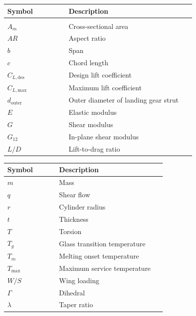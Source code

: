 \endgroup
\begingroup
\setlength{\tabcolsep}{3pt}
\renewcommand{\arraystretch}{1.08}
\scriptsize
\noindent
\begin{minipage}[t]{0.31\textwidth}
\begin{tabular}{@{}%
>{\raggedright\arraybackslash}p{0.30\linewidth}
>{\raggedright\arraybackslash}p{0.62\linewidth}@{}}
\toprule
\textbf{Symbol} & \textbf{Description} \\
\midrule
\multicolumn{2}{@{}l}{\textbf{Symbols}} \\
$A_m$               & Cross-sectional area \\
$AR$                & Aspect ratio \\
$b$                 & Span \\
$c$                 & Chord length \\
$C_{L,\mathrm{des}}$ & Design lift coefficient \\
$C_{L,\mathrm{max}}$ & Maximum lift coefficient \\
$d_{\mathrm{outer}}$ & Outer diameter of landing gear strut \\
$E$                 & Elastic modulus \\
$G$                 & Shear modulus \\
$G_{12}$            & In-plane shear modulus \\
$L/D$               & Lift-to-drag ratio \\
\bottomrule
\end{tabular}
\end{minipage}
\hfill
\begin{minipage}[t]{0.31\textwidth}
\begin{tabular}{@{}%
>{\raggedright\arraybackslash}p{0.30\linewidth}
>{\raggedright\arraybackslash}p{0.62\linewidth}@{}}
\toprule
\textbf{Symbol} & \textbf{Description} \\
\midrule
$m$                 & Mass \\
$q$                 & Shear flow \\
$r$ & Cylinder radius \\
$t$                 & Thickness \\
$T$                 & Torsion \\
$T_g$               & Glass transition temperature \\
$T_m$               & Melting onset temperature \\
$T_{\mathrm{max}}$  & Maximum service temperature \\
$W/S$               & Wing loading \\
$\Gamma$            & Dihedral \\
$\lambda$           & Taper ratio \\

\bottomrule
\end{tabular}
\end{minipage}
